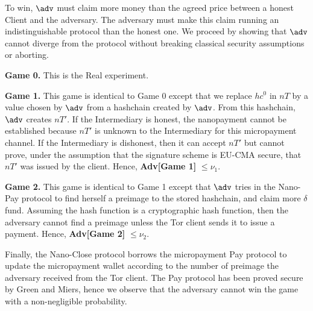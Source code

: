 To win, $\adv$ must claim more money than the agreed price between a honest Client and the adversary. The adversary must make this claim running an indistinguishable protocol than the honest one. We proceed by showing that $\adv$ cannot diverge from the protocol without breaking classical security assumptions or aborting.

\textbf{Game 0.} This is the Real experiment.

\textbf{Game 1.} This game is identical to Game 0 except that we replace $hc^0$ in $nT$ by a value chosen by $\adv$ from a hashchain created by $\adv$. From this hashchain, $\adv$ creates $nT'$. If the Intermediary is honest, the nanopayment cannot be established because $nT'$ is unknown to the Intermediary for this micropayment channel. If the Intermediary is dishonest, then it can accept $nT'$ but cannot prove, under the assumption that the signature scheme is EU-CMA secure, that $nT'$ was issued by the client. Hence, \textbf{Adv[Game 1]} $\leq \nu_1$.

\textbf{Game 2.} This game is identical to Game 1 except that $\adv$ tries in the Nano-Pay protocol to find herself a preimage to the stored hashchain, and claim more $\delta$ fund. Assuming the hash function is a cryptographic hash function, then the adversary cannot find a preimage unless the Tor client sends it to issue a payment. Hence, \textbf{Adv[Game 2]} $\leq \nu_2$.

Finally, the Nano-Close protocol borrows the micropayment Pay protocol to update the micropayment wallet according to the number of preimage the adversary received from the Tor client. The Pay protocol has been proved secure by Green and Miers, hence we observe that the adversary cannot win the game with a non-negligible probability.